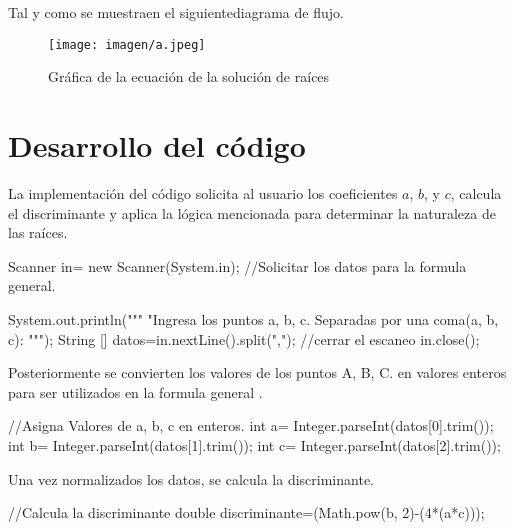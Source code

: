 \documentclass{IEEEcsmag}
\begin{document}
Tal y como se muestraen el siguientediagrama de flujo.

\begin{figure}[h!]
    \centering
    \texttt{[image: imagen/a.jpeg]}
    \caption{Gráfica de la ecuación de la solución de raíces}
    \label{fig:GraficaEcuacionRecta}
\end{figure}


\section{Desarrollo del código}
La implementación del código solicita al usuario los coeficientes \(a\), \(b\), y \(c\), calcula el discriminante y aplica la lógica mencionada para determinar la naturaleza de las raíces. 
\begin{javaCode}
 Scanner in= new Scanner(System.in);
        //Solicitar los datos para la formula general.
        
        System.out.println("""
                           "Ingresa los puntos a, b, c.
                           Separadas por una coma(a, b, c): 
                           """);
        String [] datos=in.nextLine().split(",");
        //cerrar el escaneo
        in.close();
        
\end{javaCode}

Posteriormente se convierten los valores de los puntos A, B, C. en valores enteros para ser utilizados  en la formula general .

\begin{javaCode}
    //Asigna Valores de a, b, c en enteros.
        int a= Integer.parseInt(datos[0].trim());
        int b= Integer.parseInt(datos[1].trim());
        int c= Integer.parseInt(datos[2].trim());
        
\end{javaCode}
Una vez normalizados los datos, se calcula la discriminante.
\begin{javaCode}
    //Calcula la discriminante
    double discriminante=(Math.pow(b, 2)-(4*(a*c)));
\end{javaCode}
\end{document}
